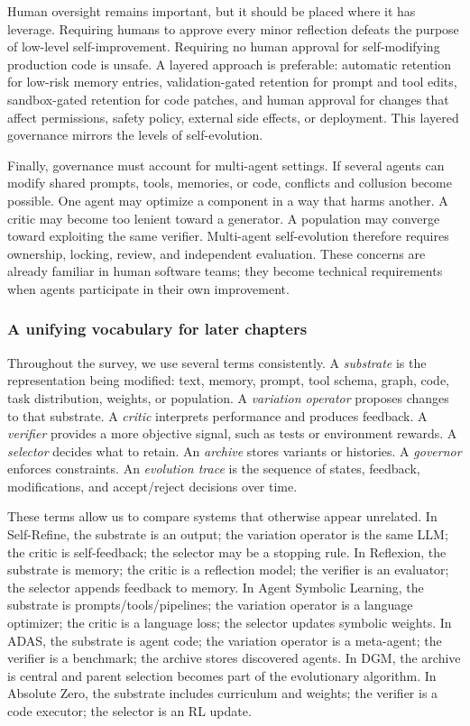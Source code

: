 Human oversight remains important, but it should be placed where it has leverage. Requiring humans to approve every minor reflection defeats the purpose of low-level self-improvement. Requiring no human approval for self-modifying production code is unsafe. A layered approach is preferable: automatic retention for low-risk memory entries, validation-gated retention for prompt and tool edits, sandbox-gated retention for code patches, and human approval for changes that affect permissions, safety policy, external side effects, or deployment. This layered governance mirrors the levels of self-evolution.

Finally, governance must account for multi-agent settings. If several agents can modify shared prompts, tools, memories, or code, conflicts and collusion become possible. One agent may optimize a component in a way that harms another. A critic may become too lenient toward a generator. A population may converge toward exploiting the same verifier. Multi-agent self-evolution therefore requires ownership, locking, review, and independent evaluation. These concerns are already familiar in human software teams; they become technical requirements when agents participate in their own improvement.

\subsubsection{A unifying vocabulary for later chapters}

Throughout the survey, we use several terms consistently. A \emph{substrate} is the representation being modified: text, memory, prompt, tool schema, graph, code, task distribution, weights, or population. A \emph{variation operator} proposes changes to that substrate. A \emph{critic} interprets performance and produces feedback. A \emph{verifier} provides a more objective signal, such as tests or environment rewards. A \emph{selector} decides what to retain. An \emph{archive} stores variants or histories. A \emph{governor} enforces constraints. An \emph{evolution trace} is the sequence of states, feedback, modifications, and accept/reject decisions over time.

These terms allow us to compare systems that otherwise appear unrelated. In Self-Refine, the substrate is an output; the variation operator is the same LLM; the critic is self-feedback; the selector may be a stopping rule. In Reflexion, the substrate is memory; the critic is a reflection model; the verifier is an evaluator; the selector appends feedback to memory. In Agent Symbolic Learning, the substrate is prompts/tools/pipelines; the variation operator is a language optimizer; the critic is a language loss; the selector updates symbolic weights. In ADAS, the substrate is agent code; the variation operator is a meta-agent; the verifier is a benchmark; the archive stores discovered agents. In DGM, the archive is central and parent selection becomes part of the evolutionary algorithm. In Absolute Zero, the substrate includes curriculum and weights; the verifier is a code executor; the selector is an RL update.

